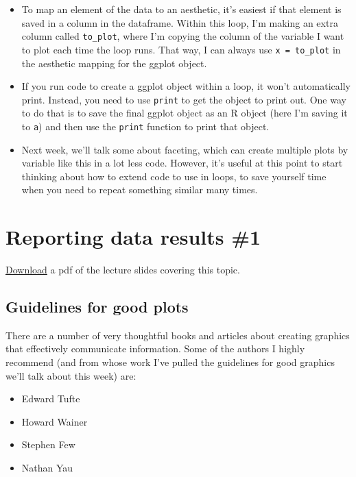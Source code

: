 \documentclass[]{book}
\providecommand{\tightlist}{%
  \setlength{\itemsep}{0pt}\setlength{\parskip}{0pt}}
\theoremstyle{definition}
\theoremstyle{definition}
\theoremstyle{definition}
\theoremstyle{remark}
\begin{document}
\begin{itemize}
\tightlist
\item
  To map an element of the data to an aesthetic, it's easiest if that
  element is saved in a column in the dataframe. Within this loop, I'm
  making an extra column called \texttt{to\_plot}, where I'm copying the
  column of the variable I want to plot each time the loop runs. That
  way, I can always use \texttt{x\ =\ to\_plot} in the aesthetic mapping
  for the ggplot object.
\item
  If you run code to create a ggplot object within a loop, it won't
  automatically print. Instead, you need to use \texttt{print} to get
  the object to print out. One way to do that is to save the final
  ggplot object as an R object (here I'm saving it to \texttt{a}) and
  then use the \texttt{print} function to print that object.
\item
  Next week, we'll talk some about faceting, which can create multiple
  plots by variable like this in a lot less code. However, it's useful
  at this point to start thinking about how to extend code to use in
  loops, to save yourself time when you need to repeat something similar
  many times.
\end{itemize}

\chapter{Reporting data results \#1}\label{reporting-data-results-1}

\href{https://github.com/geanders/RProgrammingForResearch/raw/master/slides/CourseNotes_Week4.pdf}{Download}
a pdf of the lecture slides covering this topic.

\section{Guidelines for good plots}\label{guidelines-for-good-plots}

There are a number of very thoughtful books and articles about creating
graphics that effectively communicate information. Some of the authors I
highly recommend (and from whose work I've pulled the guidelines for
good graphics we'll talk about this week) are:

\begin{itemize}
\tightlist
\item
  Edward Tufte
\item
  Howard Wainer
\item
  Stephen Few
\item
  Nathan Yau
\end{itemize}
\end{document}
